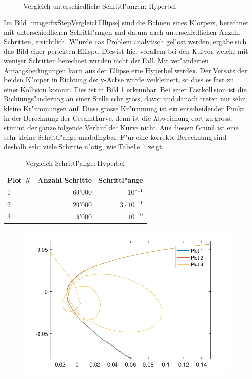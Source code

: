 \begin{refsection}
\begin{figure}
\caption{Vergleich unterschiedliche Schrittl"angen: Hyperbel}
\label{image:fixStepVergleichHyperbel}
\end{figure}
Im Bild \ref{image:fixStepVergleichEllipse} sind die Bahnen eines K"orpers, berechnet mit unterschiedlichen Schrittl"angen und darum auch unterschiedlichen Anzahl Schritten, ersichtlich.
W"urde das Problem analytisch gel"ost werden, ergäbe sich das Bild einer perfekten Ellispe.
Dies ist hier vorallem bei den Kurven welche mit weniger Schritten berechnet wurden nicht der Fall.
Mit ver"anderten Anfangsbedingungen kann aus der Ellipse eine Hyperbel werden.
Der Versatz der beiden K"orper in Richtung der y-Achse wurde verkleinert, so dass es fast zu einer Kollision kommt. 
Dies ist in Bild \ref{image:fixStepVergleichHyperbel} erkennbar.
Bei einer Fastkollision ist die Richtungs"anderung an einer Stelle sehr gross, davor und danach treten nur sehr kleine Kr"ummungen auf.
Diese grosse Kr"ummung ist ein entscheidender Punkt in der Berechnung der Gesamtkurve, denn ist die Abweichung dort zu gross, stimmt der ganze folgende Verlauf der Kurve nicht.
Aus diesem Grund ist eine sehr kleine Schrittl"ange unabdingbar.
F"ur eine korrekte Berechnung sind deshalb sehr viele Schritte n"otig, wie Tabelle \ref{table:fixStepVergleichHyperbel} zeigt.
\begin{table}
\centering
\begin{tabular}{|l|r|r|}
\hline
Plot \# & Anzahl Schritte & Schrittl"ange\\ \hline
1 & 60'000 & $10^{-11}$\\ \hline
2 & 20'000 & $3 \cdot 10^{-11}$\\ \hline
3 & 6'000 & $10^{-10}$\\ \hline
\end{tabular}
\caption{Vergleich Schrittl"ange: Hyperbel}
\label{table:fixStepVergleichHyperbel}
\end{table}
\begin{figure}
\centering
\includegraphics{schrittlaenge/images/fixStepVergleichHyperbelZoom.pdf}

\end{figure}
\end{refsection}
